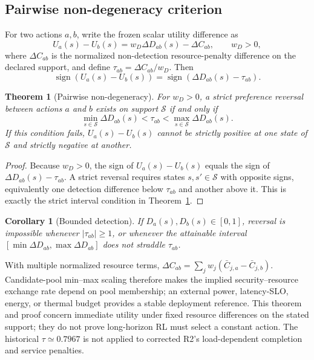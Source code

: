 \documentclass[10pt,a4paper]{article}
\newtheorem{theorem}{Theorem}
\newtheorem{corollary}{Corollary}
\begin{document}
\subsection{Pairwise non-degeneracy criterion}
For two actions $a,b$, write the frozen scalar utility difference as
\[
U_a(s)-U_b(s)=w_D\Delta D_{ab}(s)-\Delta C_{ab},\qquad w_D>0,
\]
where $\Delta C_{ab}$ is the normalized non-detection resource-penalty difference on the declared support, and define $\tau_{ab}=\Delta C_{ab}/w_D$. Then
\[
\operatorname{sign}(U_a(s)-U_b(s))=\operatorname{sign}(\Delta D_{ab}(s)-\tau_{ab}).
\]
\begin{theorem}[Pairwise non-degeneracy]\label{thm:supp-nondeg}
For $w_D>0$, a strict preference reversal between actions $a$ and $b$ exists on support $\mathcal S$ if and only if
\[
\min_{s\in\mathcal S}\Delta D_{ab}(s)<\tau_{ab}<\max_{s\in\mathcal S}\Delta D_{ab}(s).
\]
If this condition fails, $U_a(s)-U_b(s)$ cannot be strictly positive at one state of $\mathcal S$ and strictly negative at another.
\end{theorem}

\begin{proof}
Because $w_D>0$, the sign of $U_a(s)-U_b(s)$ equals the sign of $\Delta D_{ab}(s)-\tau_{ab}$. A strict reversal requires states $s,s'\in\mathcal S$ with opposite signs, equivalently one detection difference below $\tau_{ab}$ and another above it. This is exactly the strict interval condition in Theorem~\ref{thm:supp-nondeg}.
\end{proof}

\begin{corollary}[Bounded detection]
If $D_a(s),D_b(s)\in[0,1]$, reversal is impossible whenever $|\tau_{ab}|\ge 1$, or whenever the attainable interval $[\min\Delta D_{ab},\max\Delta D_{ab}]$ does not straddle $\tau_{ab}$.
\end{corollary}

With multiple normalized resource terms, $\Delta C_{ab}=\sum_j w_j(\bar C_{j,a}-\bar C_{j,b})$. Candidate-pool min--max scaling therefore makes the implied security--resource exchange rate depend on pool membership; an external power, latency-SLO, energy, or thermal budget provides a stable deployment reference. This theorem and proof concern immediate utility under fixed resource differences on the stated support; they do not prove long-horizon RL must select a constant action. The historical $\tau\simeq0.7967$ is not applied to corrected R2's load-dependent completion and service penalties.
\end{document}
